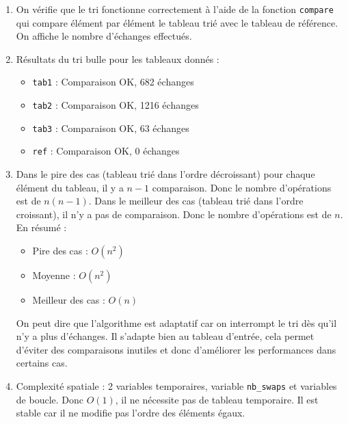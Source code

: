 \documentclass[12pt]{article}
\begin{document}
\begin{enumerate}[resume]
    \item On vérifie que le tri fonctionne correctement à l'aide de la fonction \texttt{compare} qui compare élément par élément le tableau trié avec le tableau de référence. On affiche le nombre d'échanges effectués.
    \item Résultats du tri bulle pour les tableaux donnés :
    \begin{itemize}
        \item \texttt{tab1} : Comparaison OK, 682 échanges
        \item \texttt{tab2} : Comparaison OK, 1216 échanges
        \item \texttt{tab3} : Comparaison OK, 63 échanges
        \item \texttt{ref} : Comparaison OK, 0 échanges
    \end{itemize}
    \item Dans le pire des cas (tableau trié dans l'ordre décroissant) pour chaque élément du tableau, il y a $n-1$ comparaison. Donc le nombre d'opérations est de $n(n-1)$. Dans le meilleur des cas (tableau trié dans l'ordre croissant), il n'y a pas de comparaison. Donc le nombre d'opérations est de $n$. En résumé :
    \begin{itemize}
        \item Pire des cas : $O(n^2)$ 
        \item Moyenne : $O(n^2)$
        \item Meilleur des cas : $O(n)$
    \end{itemize}
    On peut dire que l'algorithme est adaptatif car on interrompt le tri dès qu'il n'y a plus d'échanges. Il s'adapte bien au tableau d'entrée, cela permet d'éviter des comparaisons inutiles et donc d'améliorer les performances dans certains cas.
    \item Complexité spatiale : 2 variables temporaires, variable \texttt{nb\_swaps} et variables de boucle. Donc $O(1)$, il ne nécessite pas de tableau temporaire. Il est stable car il ne modifie pas l'ordre des éléments égaux.
\end{enumerate}
\end{document}
